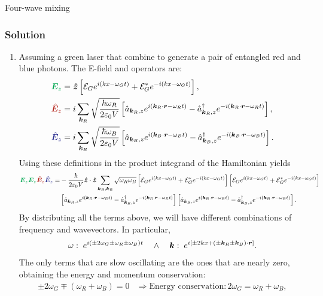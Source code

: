\begin{example}{Four-wave mixing}
    \subsubsection{Solution}
\begin{enumerate}[itemsep=0pt,topsep=0pt,parsep=0pt,label=\alph*)]
  \item Assuming a green laser that combine to generate a pair of entangled red and blue photons. 
  The E-field and operators are:
  \begin{align*}
    \textcolor{Green}{\bE_z}&=\hz\left[\E_Ge^{i(kx-\omega_Gt)}+\E_G^*e^{-i(kx-\omega_Gt)}\right],\\
    \textcolor{BrickRed}{\hbE_z}&=i\sum_{\bk_R}\sqrt{\frac{\hbar\omega_R}{2\varepsilon_0V}}\left[\ha_{\bk_R,z}e^{i(\bk_R\cdot\br-\omega_Rt)}-\ha^\dagger_{\bk_R,z}e^{-i(\bk_R\cdot\br-\omega_R t)}\right],\\
    \textcolor{Blue}{\hbE_z}&=i\sum_{\bk_B}\sqrt{\frac{\hbar\omega_B}{2\varepsilon_0V}}\left[\ha_{\bk_B,z}e^{i(\bk_B\cdot\br-\omega_Bt)}-\ha^\dagger_{\bk_B,z}e^{-i(\bk_B\cdot\br-\omega_Bt)}\right].
  \end{align*}
  Using these definitions in the product integrand of the Hamiltonian yields
  {\small
  \begin{align*}
    \textcolor{Green}{\bE_z}\textcolor{Green}{\bE_z}\textcolor{BrickRed}{\hbE_z}
    \textcolor{Blue}{\hbE_z}=&-\frac{\hbar}{2\varepsilon_0V}\hz\cdot\hz\sum_{\bk_B,\bk_R}\sqrt{\omega_R\omega_B}\left[\E_Ge^{i(kx-\omega_Gt)}+\E_G^*e^{-i(kx-\omega_Gt)}\right]\left[\E_Ge^{i(kx-\omega_Gt)}+\E_G^*e^{-i(kx-\omega_Gt)}\right]\\
    &\left[\ha_{\bk_R,z}e^{i(\bk_R\cdot\br-\omega_Rt)}-\ha^\dagger_{\bk_R,z}e^{-i(\bk_R\cdot\br-\omega_R t)}\right]
    \left[\ha_{\bk_B,z}e^{i(\bk_B\cdot\br-\omega_Bt)}-\ha^\dagger_{\bk_B,z}e^{-i(\bk_B\cdot\br-\omega_Bt)}\right].
  \end{align*}}
  By distributing all the terms above, we will have different combinations of frequency and wavevectors.
  In particular,
  \begin{align*}
    \omega:\;e^{i(\pm 2\omega_G\pm\omega_R\pm\omega_B)t}\quad\land\quad\bm{k}:\;e^{i[\pm2kx+(\pm\bm{k}_R\pm\bm{k}_B)\cdot\bm{r}]}.
  \end{align*}
  The only terms that are slow oscillating are the ones that are nearly zero, obtaining the energy and 
  momentum conservation:
  \begin{align*}
    \pm2\omega_G\mp(\omega_R+\omega_B)=0&\Longrightarrow\text{Energy conservation}:2\omega_G=\omega_R+\omega_B,\\

\end{align*}
\end{enumerate}
\end{example}
